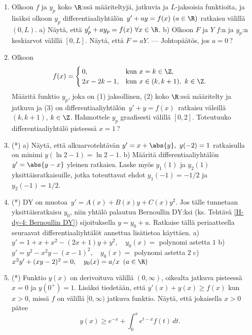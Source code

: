 \begin{enumerate}
\item \label{H-dy-4: jaksolliset ratkaisut}
Olkoon $f$ ja $y_p$ koko $\R$:ssä määriteltyjä, jatkuvia ja $L$-jaksoisia funktioita, ja
lisäksi olkoon $y_p$ differentiaaliyhtälön $\,y'+ay=f(x)\ (a\in\R)$ ratkaisu
välillä $(0,L)$. \vspace{1mm}\newline
a) Näytä, että $y_p'+ay_p=f(x)\ \forall x\in\R$. \newline
b) Olkoon $F$ ja $Y$ $f$:n ja $y_p$:n keskiarvot välillä $[0,L]$. Näytä, että $F=aY$. 
--- Johtopäätös, jos $a=0$\,? 

\item
Olkoon
\[
f(x) = \begin{cases} 
       \,0, &\text{kun}\ x=k\in\Z, \\ \,2x-2k-1, &\text{kun}\ x\in(k,k+1),\ k\in\Z.
       \end{cases}
\]
Määritä funktio $y_p$, joka on (1) jaksollinen, (2) koko $\R$:ssä määritelty ja jatkuva ja 
(3) on differentiaaliyhtälön $\,y'+y=f(x)\,$ ratkaisu väleillä $(k,k+1)$, $k\in\Z$. Hahmottele
$y_p$ graafisesti välillä $[0,2]$. Toteutuuko differentiaaliyhtälö pisteessä $x=1$\,? 

\item (*)
a) Näytä, että alkuarvotehtävän $y'=x+\abs{y},\ y(-2)=1$ ratkaisulla on minimi
$y(\ln 2-1)=\ln 2-1$. \newline
b) Määritä differentiaaliyhtälön $y'=\abs{y-x}$ yleinen ratkaisu. Laske myös $y_1(1)$ ja
$y_2(1)$ yksittäisratkaisuille, jotka toteuttavat ehdot $y_1(-1)=-1/2$ ja $y_2(-1)=1/2$.

\item (*) \label{H-dy-4: Riccatin DY}
 
 DY on muotoa $\,y'=A(x)+B(x)y+C(x)y^2$. Jos tälle tunnetaan yksittäisratkaisu
$y_0$, niin yhtälö palautuu Bernoullin DY:ksi (ks. Tehtävä \ref{H-dy-4: Bernoullin DY}) 
sijoituksella $y=y_0+u$. Ratkaise tällä periaatteella seuraavat differentiaaliyhtälöt annettua
lisätietoa käyttäen. \vspace{1mm}\newline
a) \ $y'=1+x+x^2-(2x+1)y+y^2, \quad y_0(x)=$ polynomi astetta $1$ \newline
b) \ $y'=y^2-x^2y-(x-1)^2, \quad y_0(x)=$ polynomi astetta $2$ \newline
c) \ $x^2y'+(xy-2)^2=0, \quad y_0(x)=a/x\,\ (a\in\R)$

\item (*)
Funktio $y(x)$ on derivoituva välillä $(0,\infty)$, oikealta jatkuva pisteessä $x=0$ ja
$y(0^+)=1$. Lisäksi tiedetään, että $y'(x)+y(x) \ge f(x)$ kun $x>0$, missä $f$ on  välillä
$[0,\infty)$ jatkuva funktio. Näytä, että jokaisella $x>0$ pätee
\[
y(x) \ge e^{-x} + \int_0^x e^{t-x} f(t)\,dt.
\]


\end{enumerate}
